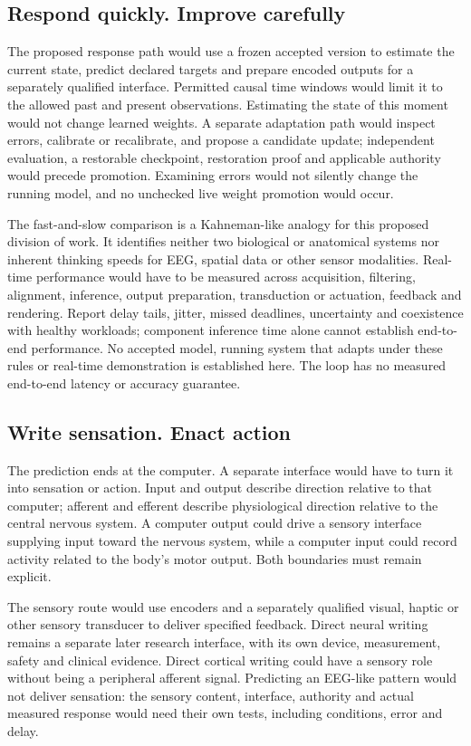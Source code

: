 \subsection{Respond quickly. Improve carefully}
\label{b2-frozen-response}
The proposed response path would use a frozen accepted version to estimate
the current state, predict declared targets and prepare encoded outputs for
a separately qualified interface. Permitted causal time windows would limit
it to the allowed past and present observations. Estimating the state of this
moment would not change learned weights. A separate adaptation path would
inspect errors, calibrate or recalibrate, and propose a candidate update;
independent evaluation, a restorable checkpoint, restoration proof and
applicable authority would precede promotion. Examining errors would not
silently change the running model, and no unchecked live weight promotion
would occur.

The fast-and-slow comparison is a Kahneman-like analogy for this proposed
division of work. It identifies neither two biological or anatomical systems
nor inherent thinking speeds for EEG, spatial data or other sensor modalities.
Real-time performance would have to be measured across acquisition, filtering,
alignment, inference, output preparation, transduction or actuation, feedback
and rendering. Report delay tails, jitter, missed deadlines, uncertainty and
coexistence with healthy workloads; component inference time alone cannot
establish end-to-end performance. No accepted model, running system that adapts
under these rules or real-time demonstration is established here. The loop has
no measured end-to-end latency or accuracy guarantee.

\subsection{Write sensation. Enact action}
\label{b2-output-interfaces}
The prediction ends at the computer. A separate interface would have to turn
it into sensation or action. Input and output describe direction relative to
that computer; afferent and efferent describe physiological direction relative
to the central nervous system. A computer output could drive a sensory
interface supplying input toward the nervous system, while a computer input
could record activity related to the body's motor output. Both boundaries
must remain explicit.

The sensory route would use encoders and a separately qualified visual, haptic
or other sensory transducer to deliver specified feedback. Direct neural
writing remains a separate later research interface, with its own device,
measurement, safety and clinical evidence. Direct cortical writing could have
a sensory role without being a peripheral afferent signal. Predicting an
EEG-like pattern would not deliver sensation: the sensory content, interface,
authority and actual measured response would need their own tests, including
conditions, error and delay.

